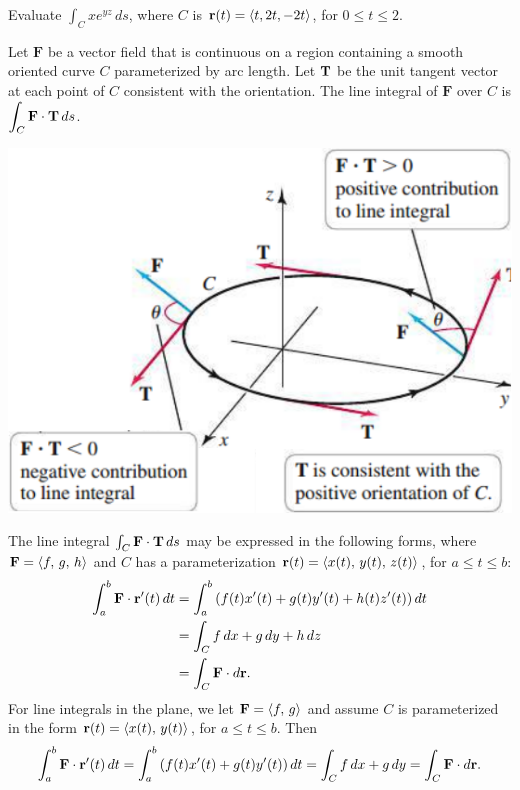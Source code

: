 \documentclass[../mathNotesPreamble]{subfiles}
\begin{document}
  \begin{ex*}
    Evaluate $\displaystyle \int_C xe^{yz}\,ds$, where $C$ is ${\mathbf{r}}(t)={\left\langle t,2t,-2t \right\rangle}$, for $0\leq t\leq 2$.
  \end{ex*}
  \pagebreak

  \begin{defn*}
    Let $\mathbf F$ be a vector field that is continuous on a region containing a smooth oriented curve $C$ parameterized by arc length. Let ${\mathbf{T}}$ be the unit tangent vector at each point of $C$ consistent with the orientation. The line integral of $\mathbf F$ over $C$ is $\displaystyle\int_C \mathbf F\cdot{\mathbf{T}}\,ds$.
  \end{defn*}

  \begin{center}
    \includegraphics[width=0.425\linewidth]{../images/briggs_17_02/fig17_19}
    \vspace*{-0.5\baselineskip}
  \end{center}

  \begin{thmBox*}
    The line integral $\int_C \mathbf F\cdot{\mathbf{T}}\,ds$ may be expressed in the following forms, where $\mathbf F={\left\langle f,\,g,\,h \right\rangle}$ and $C$ has a parameterization ${\mathbf{r}}(t)={\left\langle x(t),\,y(t),\,z(t) \right\rangle}$, for $a\leq t\leq b$:
    \begin{align*}
      \int_a^b \mathbf F\cdot{\mathbf{r}}'(t)\,dt &=\int_a^b {\left(f(t)x'(t)+g(t)y'(t)+h(t)z'(t)\right)}\,dt\\
        &=\int_C f\,dx+g\,dy+h\,dz\\
        &=\int_C \mathbf F\cdot d{\mathbf{r}}.
    \end{align*}
    For line integrals in the plane, we let $\mathbf F={\left\langle f,\,g \right\rangle}$ and assume $C$ is parameterized in the form ${\mathbf{r}}(t)={\left\langle x(t),\,y(t) \right\rangle}$, for $a\leq t\leq b$. Then
      \[\int_a^b \mathbf F\cdot {\mathbf{r}}'(t)\,dt=\int_a^b {\left(f(t)x'(t)+g(t)y'(t)\right)}\,dt= \int_C f\,dx+g\,dy=\int_C \mathbf F\cdot d{\mathbf{r}}.\]
  \end{thmBox*}
  \pagebreak
\end{document}
